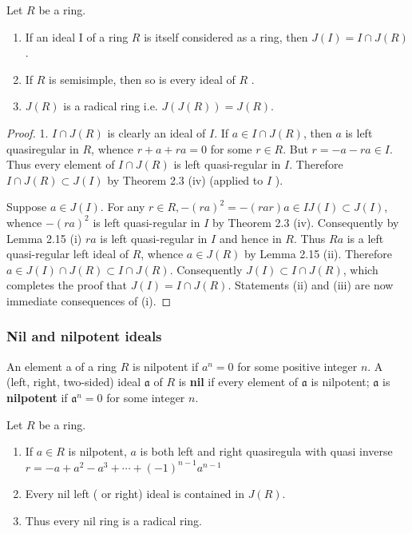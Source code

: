 \begin{theorem}
    Let $R$ be a ring.
    \begin{enumerate}
        \item
              If an ideal I of a ring $R$ is itself considered as a ring, then $J(I)=I \cap J(R)$.
              $\qquad$

        \item
              If $R$ is semisimple, then so is every ideal of $R$ .
        \item
              $J(R)$ is a radical ring i.e. $J\left(J\left(R\right)\right)=J\left(R\right)$.
    \end{enumerate}
    \begin{proof}
        1.
        $I \cap J(R)$ is clearly an ideal of $I$. If $a \in I \cap J(R)$, then $a$ is left quasiregular in $R$, whence $r+a+r a=0$ for some $r \in R$. But $r=-a-r a \in I$. Thus every element of $I \cap J(R)$ is left quasi-regular in $I$. Therefore $I \cap J(R) \subset J(I)$ by Theorem 2.3 (iv) (applied to $I$ ).

        Suppose $a \in J(I)$. For any $r \in R,-(r a)^2=-(r a r) a \in I J(I) \subset J(I)$, whence $-(r a)^2$ is left quasi-regular in $I$ by Theorem 2.3 (iv). Consequently by Lemma 2.15 (i) $r a$ is left quasi-regular in $I$ and hence in $R$. Thus $R a$ is a left quasi-regular left ideal of $R$, whence $a \in J(R)$ by Lemma 2.15 (ii). Therefore $a \in J(I) \cap J(R) \subset I \cap J(R)$. Consequently $J(I) \subset I \cap J(R)$, which completes the proof that $J(I)=I \cap J(R)$. Statements (ii) and (iii) are now immediate consequences of (i).
    \end{proof}
\end{theorem}


\subsubsection{Nil and nilpotent ideals} %
\begin{definition}
    An element a of a ring $R$ is nilpotent if $a^n=0$ for some positive integer $n$.
    A (left, right, two-sided) ideal $\mathfrak{a}$ of $R$ is \textbf{nil} if every element of $\mathfrak{a}$ is nilpotent; $\mathfrak{a}$ is \textbf{nilpotent} if $\mathfrak{a}^n=0$ for some integer $n$.
\end{definition}


\begin{theorem}
    \label{thm: nil ideal}
    Let $R$ be a ring.
    \begin{enumerate}
        \item
              If $a\in R$ is nilpotent, $a$ is both left and right quasiregula with quasi inverse $r=-a+a^2-a^3+\cdots+(-1)^{n-1} a^{n-1}$
        \item
              Every nil left ( or right) ideal is contained in $J(R)$.
        \item
              Thus every nil ring is a radical ring.
    \end{enumerate}
\end{theorem}

